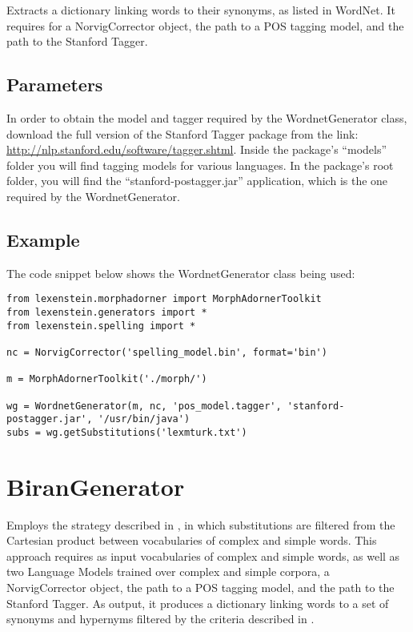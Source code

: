 Extracts a dictionary linking words to their synonyms, as listed in WordNet. It requires for a NorvigCorrector object, the path to a POS tagging model, and the path to the Stanford Tagger.

\subsection{Parameters}

In order to obtain the model and tagger required by the WordnetGenerator class, download the full version of the Stanford Tagger package from the link: \url{http://nlp.stanford.edu/software/tagger.shtml}. Inside the package's ``models'' folder you will find tagging models for various languages. In the package's root folder, you will find the ``stanford-postagger.jar'' application, which is the one required by the WordnetGenerator.

\subsection{Example}

The code snippet below shows the WordnetGenerator class being used:

\begin{lstlisting}
from lexenstein.morphadorner import MorphAdornerToolkit
from lexenstein.generators import *
from lexenstein.spelling import *

nc = NorvigCorrector('spelling_model.bin', format='bin')

m = MorphAdornerToolkit('./morph/')

wg = WordnetGenerator(m, nc, 'pos_model.tagger', 'stanford-postagger.jar', '/usr/bin/java')
subs = wg.getSubstitutions('lexmturk.txt')
\end{lstlisting}









\section{BiranGenerator}

Employs the strategy described in \cite{Biran2011}, in which substitutions are filtered from the Cartesian product between vocabularies of complex and simple words. This approach requires as input vocabularies of complex and simple words, as well as two Language Models trained over complex and simple corpora, a NorvigCorrector object, the path to a POS tagging model, and the path to the Stanford Tagger. As output, it produces a dictionary linking words to a set of synonyms and hypernyms filtered by the criteria described in \cite{Biran2011}.

